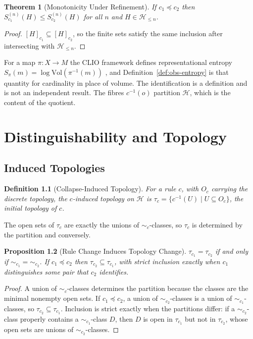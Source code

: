 \documentclass[12pt,oneside,openany]{book}
\theoremstyle{spherepop}
\newtheorem{definition}{Definition}[chapter]
\newtheorem{theorem}[definition]{Theorem}
\newtheorem{proposition}[definition]{Proposition}
\theoremstyle{remarkstyle}
\newcommand{\calH}{\mathcal{H}}
\begin{document}
\begin{theorem}[Monotonicity Under Refinement]
\label{thm:entropy-monotone}
If $c_1\preceq c_2$ then $S^{(n)}_{c_1}(H)\le S^{(n)}_{c_2}(H)$ for all $n$ and $H\in\calH_{\le n}$.
\end{theorem}

\begin{proof}
$[H]_{c_1}\subseteq[H]_{c_2}$, so the finite sets satisfy the same inclusion after intersecting with $\calH_{\le n}$.
\end{proof}

For a map $\pi:X\to M$ the CLIO framework defines representational entropy $S_\pi(m)=\log\mathrm{Vol}(\pi^{-1}(m))$ \cite{clio}, and Definition~\ref{def:obs-entropy} is that quantity for cardinality in place of volume. The identification is a definition and is not an independent result. The fibres $c^{-1}(o)$ partition $\calH$, which is the content of the quotient.

\chapter{Distinguishability and Topology}
\label{ch:topology}

\section{Induced Topologies}

\begin{definition}[Collapse-Induced Topology]
For a rule $c$, with $O_c$ carrying the discrete topology, the \emph{$c$-induced topology} on $\calH$ is $\tau_c=\{c^{-1}(U)\mid U\subseteq O_c\}$, the initial topology of $c$.
\end{definition}

The open sets of $\tau_c$ are exactly the unions of $\sim_c$-classes, so $\tau_c$ is determined by the partition and conversely.

\begin{proposition}[Rule Change Induces Topology Change]
\label{prop:topology-change}
$\tau_{c_1}=\tau_{c_2}$ if and only if ${\sim_{c_1}}={\sim_{c_2}}$. If $c_1\preceq c_2$ then $\tau_{c_2}\subseteq\tau_{c_1}$, with strict inclusion exactly when $c_1$ distinguishes some pair that $c_2$ identifies.
\end{proposition}

\begin{proof}
A union of $\sim_c$-classes determines the partition because the classes are the minimal nonempty open sets. If $c_1\preceq c_2$, a union of $\sim_{c_2}$-classes is a union of $\sim_{c_1}$-classes, so $\tau_{c_2}\subseteq\tau_{c_1}$. Inclusion is strict exactly when the partitions differ: if a $\sim_{c_2}$-class properly contains a $\sim_{c_1}$-class $D$, then $D$ is open in $\tau_{c_1}$ but not in $\tau_{c_2}$, whose open sets are unions of $\sim_{c_2}$-classes.
\end{proof}
\end{document}
